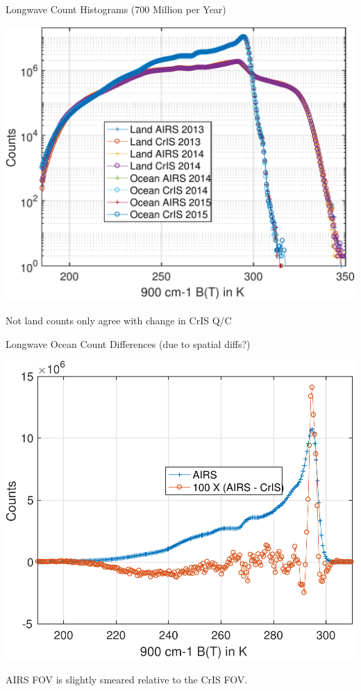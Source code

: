 \documentclass[10pt,t]{beamer}
\begin{document}
\begin{frame}[label={sec:org69bb52a}]{Longwave Count Histograms (700 Million per Year)}
\begin{center}
\includegraphics[width=0.7\linewidth]{./Figs/Pdf/land_and_ocean_allT.pdf}
\end{center}
\vspace{-0.15in}
\small
Not land counts only agree with change in CrIS Q/C
\end{frame}

\begin{frame}[label={sec:orgaa004ae}]{Longwave Ocean Count Differences (due to spatial diffs?)}
\begin{center}
\includegraphics[width=0.7\linewidth]{./Figs/Pdf/ocean_linear_pdf_and_diff.pdf}
\end{center}
\vspace{-0.15in}
\small
AIRS FOV is slightly smeared relative to the CrIS FOV.
\end{frame}
\end{document}
